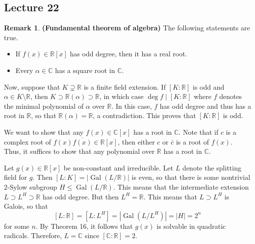 \documentclass[10pt,letterpaper,cm]{nupset}
\theoremstyle{definition}
\newtheorem{remark}{Remark}
\newcommand{\C}{\mathbb C}
\newcommand{\R}{\mathbb R}
\newcommand{\1}{\mathbf{1}}
\newcommand{\0}{\vec 0}
\DeclareMathOperator{\gal}{Gal}
\begin{document}
\subsection{Lecture 22}


\begin{remark}{\textbf{(Fundamental theorem of algebra)}}
The following statements are true.
\begin{itemize}
\item If $f(x) \in \R[x]$ has odd degree, then it has a real root.
\item Every $\alpha \in \C$ has a square root in $\C$.
\end{itemize}
Now, suppose that $K \supsetneq \R$ is a finite field extension. If $[K : \R]$ is odd and $\alpha \in K \setminus \R$, then $K \supset \R(\alpha) \supset \R$, in which case $\deg{f} \mid [K : \R]$ where $f$ denotes the minimal polynomial of $\alpha$ over $\R$.  In this case, $f$ has odd degree and thus has a root in $\R$, so that $\R(\alpha) = \R$, a contradiction. This proves that $[K : \R]$ is odd.

We want to show that any $f(x) \in \C[x]$ has a root in $\C$. Note that if $c$ is a complex root of $f(x)\overline{f(x)} \in \R[x]$, then either $c$ or $\bar{c}$ is a root of $f(x)$.  Thus, it suffices to show that any polynomial over $\R$ has a root in $\C$.

Let $g(x) \in \R[x]$ be non-constant and irreducible. Let $L$ denote the splitting field for $g$. Then $[L :K] = |\gal(L/\R)|$ is even, so that there is some nontrivial $2$-Sylow subgroup $H \leq \gal(L/\R)$. This means that the intermediate extension $L \supset L^H \supset \R$ has odd degree. But then $L^H = \R$. This means that $L \supset L^H$ is Galois, so that $$[L: \R] = [L: L^H] = |\gal(L/L^H)| = |H| = 2^n$$ for some $n$. By Theorem 16, it follows that $g(x)$ is solvable in quadratic radicals. Therefore, $L = \C$ since $[\C : \R] = 2$. 
\end{remark}
\end{document}
